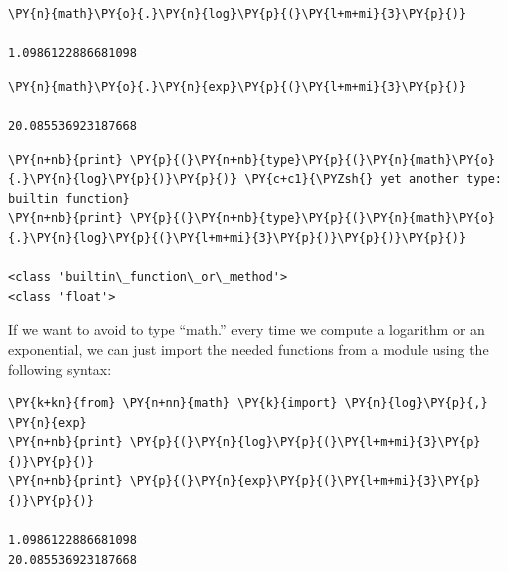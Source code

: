 \begin{tcolorbox}[breakable, size=fbox, boxrule=1pt, pad at break*=1mm, colback=cellbackground, colframe=cellborder]            
\begin{Verbatim}[commandchars=\\\{\}]
\PY{n}{math}\PY{o}{.}\PY{n}{log}\PY{p}{(}\PY{l+m+mi}{3}\PY{p}{)}

1.0986122886681098
\end{Verbatim}
\end{tcolorbox}

\begin{tcolorbox}[breakable, size=fbox, boxrule=1pt, pad at break*=1mm, colback=cellbackground, colframe=cellborder]            
\begin{Verbatim}[commandchars=\\\{\}]
\PY{n}{math}\PY{o}{.}\PY{n}{exp}\PY{p}{(}\PY{l+m+mi}{3}\PY{p}{)}

20.085536923187668
\end{Verbatim}
\end{tcolorbox}

\begin{tcolorbox}[breakable, size=fbox, boxrule=1pt, pad at break*=1mm, colback=cellbackground, colframe=cellborder]            
\begin{Verbatim}[commandchars=\\\{\}]
\PY{n+nb}{print} \PY{p}{(}\PY{n+nb}{type}\PY{p}{(}\PY{n}{math}\PY{o}{.}\PY{n}{log}\PY{p}{)}\PY{p}{)} \PY{c+c1}{\PYZsh{} yet another type: builtin function}
\PY{n+nb}{print} \PY{p}{(}\PY{n+nb}{type}\PY{p}{(}\PY{n}{math}\PY{o}{.}\PY{n}{log}\PY{p}{(}\PY{l+m+mi}{3}\PY{p}{)}\PY{p}{)}\PY{p}{)}

<class 'builtin\_function\_or\_method'>
<class 'float'>
\end{Verbatim}
\end{tcolorbox}

If we want to avoid to type ``math.'' every time we compute a logarithm or an exponential, we can just import the needed functions from a module using the following syntax:

\begin{tcolorbox}[breakable, size=fbox, boxrule=1pt, pad at break*=1mm, colback=cellbackground, colframe=cellborder]            
\begin{Verbatim}[commandchars=\\\{\}]
\PY{k+kn}{from} \PY{n+nn}{math} \PY{k}{import} \PY{n}{log}\PY{p}{,} \PY{n}{exp}
\PY{n+nb}{print} \PY{p}{(}\PY{n}{log}\PY{p}{(}\PY{l+m+mi}{3}\PY{p}{)}\PY{p}{)}
\PY{n+nb}{print} \PY{p}{(}\PY{n}{exp}\PY{p}{(}\PY{l+m+mi}{3}\PY{p}{)}\PY{p}{)}

1.0986122886681098
20.085536923187668
\end{Verbatim}
\end{tcolorbox}

